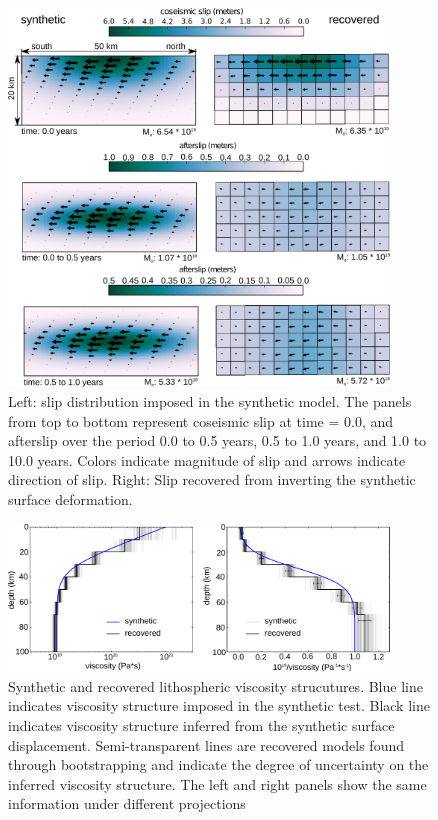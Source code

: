 \documentclass[12pt]{article}
\begin{document}
\begin{figure}[h!]\label{figure2}
  \centering
  \includegraphics[width=0.9\textwidth]{FinalFigures/Figure2.pdf}
  \caption{Left: slip distribution imposed in the synthetic model.
    The panels from top to bottom represent coseismic slip at time =
    0.0, and afterslip over the period 0.0 to 0.5 years, 0.5 to 1.0
    years, and 1.0 to 10.0 years.  Colors indicate magnitude of slip
    and arrows indicate direction of slip.  Right: Slip recovered from
    inverting the synthetic surface deformation.}
  \label{figure 2}
\end{figure}

\begin{figure}[h!]\label{figure3}
  \centering
  \includegraphics[width=0.9\textwidth]{FinalFigures/Figure3.pdf}
  \caption{Synthetic and recovered lithospheric viscosity strucutures.
    Blue line indicates viscosity structure imposed in the synthetic
    test. Black line indicates viscosity structure inferred from the
    synthetic surface displacement.  Semi-transparent lines are
    recovered models found through bootstrapping and indicate the
    degree of uncertainty on the inferred viscosity structure.  The
    left and right panels show the same information under
    different projections}
  \label{figure 3}
\end{figure}
\end{document}
